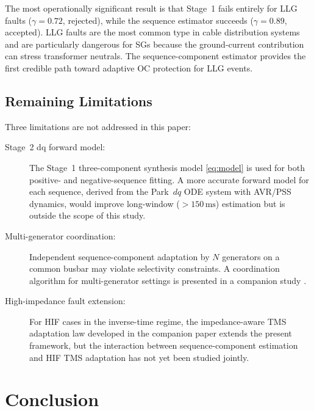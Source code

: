\documentclass[10pt,journal,twoside]{IEEEtran}
\newcommand{\mss}{\,\text{ms}}
\begin{document}
The most operationally significant result is that Stage~1 fails entirely
for LLG faults ($\gamma = 0.72$, rejected), while the sequence estimator
succeeds ($\gamma = 0.89$, accepted).  LLG faults are the most common
type in cable distribution systems and are particularly dangerous for
SGs because the ground-current contribution can stress transformer
neutrals.  The sequence-component estimator provides the first credible
path toward adaptive OC protection for LLG events.

\subsection{Remaining Limitations}
\label{sec:discussion:limits}

Three limitations are not addressed in this paper:

\begin{description}
\item[Stage~2 dq forward model:]
     The Stage~1 three-component synthesis model \eqref{eq:model} is used
     for both positive- and negative-sequence fitting.  A more accurate
     forward model for each sequence, derived from the Park~$dq$ ODE system
     with AVR/PSS dynamics, would improve long-window ($> 150\mss$)
     estimation but is outside the scope of this study.

\item[Multi-generator coordination:]
     Independent sequence-component adaptation by $N$ generators on a
     common busbar may violate selectivity constraints.  A coordination
     algorithm for multi-generator settings is presented in a companion
     study \cite{Eluvathingal2026_TR02}.

\item[High-impedance fault extension:]
     For HIF cases in the inverse-time regime, the impedance-aware TMS
     adaptation law developed in the companion paper extends the present
     framework, but the interaction between sequence-component estimation
     and HIF TMS adaptation has not yet been studied jointly.
\end{description}

\section{Conclusion}
\label{sec:conclusion}
\end{document}
